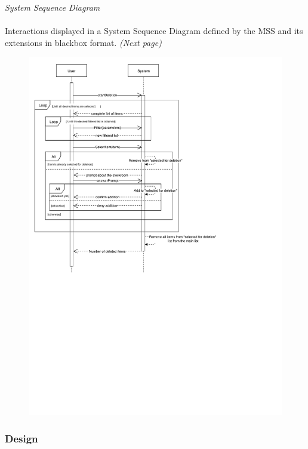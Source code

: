 \documentclass{article}
\begin{document}
\textsl{System Sequence Diagram}\\\\
Interactions displayed in a System Sequence Diagram defined by the MSS and its extensions in blackbox format.
\textit{(Next page)}
\begin{figure}[H]
	\centering
	\includegraphics[scale=1]{SD-bb-delete.pdf}
\end{figure}
\subsubsection*{Design}
\end{document}
